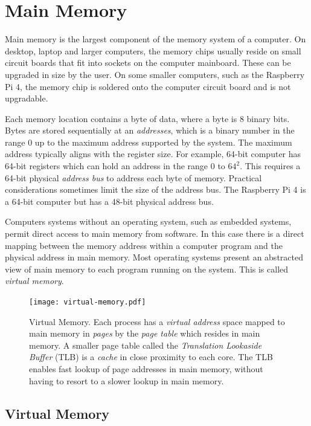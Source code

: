\documentclass{report}
\begin{document}
%
%
\section{Main Memory}

Main memory is the largest component of the memory system of a computer. On desktop, laptop and larger computers, the memory chips usually reside on small circuit boards that fit into sockets on the computer mainboard. These can be upgraded in size by the user. On some smaller computers, such as the Raspberry Pi 4, the memory chip is soldered onto the computer circuit board and is not upgradable.

Each memory location contains a byte of data, where a byte is 8 binary bits. Bytes are stored sequentially at an \emph{addresses}, which is a binary number in the range 0 up to the maximum address supported by the system. The maximum address typically aligns with the register size. For example, 64-bit computer has 64-bit registers which can hold an address in the range 0 to $64^2$. This requires a 64-bit physical \emph{address bus} to address each byte of memory. Practical considerations sometimes limit the size of the address bus. The Raspberry Pi 4 is a 64-bit computer but has a 48-bit physical address bus.

Computers systems without an operating system, such as embedded systems, permit direct access to main memory from software. In this case there is a direct mapping between the memory address within a computer program and the physical address in main memory. Most operating systems present an abstracted view of main memory to each program running on the system. This is called \emph{virtual memory}.
 
    
\begin{figure}
	\centering	
	\texttt{[image: virtual-memory.pdf]}
	\caption{Virtual Memory. Each process has a \emph{virtual address} space mapped to main memory in \emph{pages} by the \emph{page table} which resides in main memory. A smaller page table called the \emph{Translation Lookaside Buffer} (TLB) is a \emph{cache} in close proximity to each core. The TLB enables fast lookup of page addresses in main memory, without having to resort to a slower lookup in main memory.}
\end{figure}

\subsection{Virtual Memory}
\end{document}
